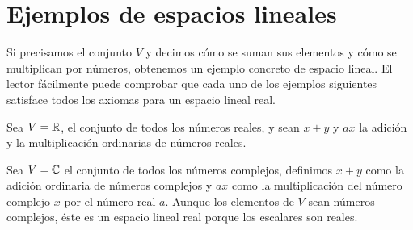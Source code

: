 \section{Ejemplos de espacios lineales}

Si precisamos el conjunto $V$ y decimos cómo se suman sus elementos y cómo se multiplican por números, obtenemos un ejemplo concreto de espacio lineal. El lector fácilmente puede comprobar que cada uno de los ejemplos siguientes satisface todos los axiomas para un espacio lineal real.

\begin{example}
    Sea $V=\mathbb{R}$, el conjunto de todos los números reales, y sean $x+y$ y $ax$ la adición y la multiplicación ordinarias de números reales.
\end{example}

\begin{example}
    Sea $V=\mathbb{C}$ el conjunto de todos los números complejos, definimos $x+y$ como la adición ordinaria de números complejos y $ax$ como la multiplicación del número complejo $x$ por el número real $a$. Aunque los elementos de $V$ sean números complejos, éste es un espacio lineal real porque los escalares son reales.
\end{example}
